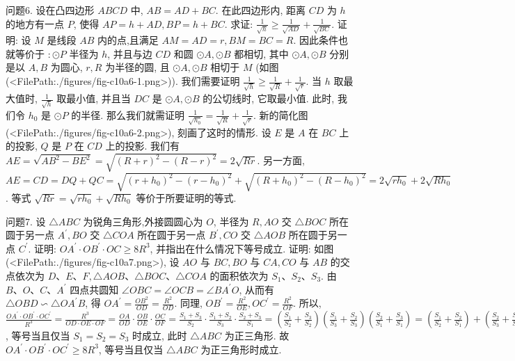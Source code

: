 问题6. 设在凸四边形 $A B C D$ 中, $A B=A D+B C$. 在此四边形内, 距离 $C D$ 为 $h$ 的地方有一点 $P$, 使得 $A P=h+A D, B P=h+B C$. 求证: $\frac{1}{\sqrt{h}} \geqslant \frac{1}{\sqrt{A D}}+\frac{1}{\sqrt{B C}}$.
证明: 设 $M$ 是线段 $A B$ 内的点,且满足 $A M= A D=r, B M=B C=R$. 因此条件也就等价于 $: \odot P$ 半径为 $h$, 并且与边 $C D$ 和圆 $\odot A, \odot B$ 都相切, 其中 $\odot A, \odot B$ 分别是以 $A, B$ 为圆心, $r, R$ 为半径的圆, 且 $\odot A, \odot B$ 相切于 $M$ (如图(<FilePath:./figures/fig-c10a6-1.png>)).
我们需要证明 $\frac{1}{\sqrt{h}} \geqslant \frac{1}{\sqrt{R}}+\frac{1}{\sqrt{r}}$. 当 $h$ 取最大值时, $\frac{1}{\sqrt{h}}$ 取最小值, 并且当 $D C$ 是 $\odot A, \odot B$ 的公切线时, 它取最小值.
此时, 我们令 $h_0$ 是 $\odot P$ 的半径.
那么我们就需证明 $\frac{1}{\sqrt{h_0}}=\frac{1}{\sqrt{R}}+\frac{1}{\sqrt{r}}$.
新的简化图(<FilePath:./figures/fig-c10a6-2.png>), 刻画了这时的情形.
设 $E$ 是 $A$ 在 $B C$ 上的投影, $Q$ 是 $P$ 在 $C D$ 上的投影.
我们有 $A E= \sqrt{A B^2-B E^2}=\sqrt{(R+r)^2-(R-r)^2}=2 \sqrt{R r}$.
另一方面, $A E=C D=D Q+Q C=\sqrt{\left(r+h_0\right)^2-\left(r-h_0\right)^2}+ \sqrt{\left(R+h_0\right)^2-\left(R-h_0\right)^2}=2 \sqrt{r h_0}+2 \sqrt{R h_0}$. 等式 $\sqrt{R r}=\sqrt{r h_0}+\sqrt{R h_0}$ 等价于所要证明的等式.



问题7. 设 $\triangle A B C$ 为锐角三角形,外接圆圆心为 $O$, 半径为 $R, A O$ 交 $\triangle B O C$ 所在圆于另一点 $A^{\prime}, B O$ 交 $\triangle C O A$ 所在圆于另一点 $B^{\prime}, C O$ 交 $\triangle A O B$ 所在圆于另一点 $C^{\prime}$. 证明: $O A^{\prime} \cdot O B^{\prime} \cdot O C \geqslant 8 R^3$, 并指出在什么情况下等号成立.
证明: 如图(<FilePath:./figures/fig-c10a7.png>), 设 $A O$ 与 $B C, B O$ 与 $C A, C O$ 与 $A B$ 的交点依次为 $D 、 E 、 F, \triangle A O B 、 \triangle B O C 、 \triangle C O A$ 的面积依次为 $S_1 、 S_2 、 S_3$. 由 $B 、 O 、 C 、 A^{\prime}$ 四点共圆知 $\angle O B C=\angle O C B=\angle B A^{\prime} O$, 从而有 $\triangle O B D \backsim \triangle O A^{\prime} B$, 得 $O A^{\prime}=\frac{O B^2}{O D}=\frac{R^2}{O D}$. 同理, $O B^{\prime}=\frac{R^2}{O E}, O C^{\prime}=\frac{R^2}{O F}$. 所以, $\frac{O A^{\prime} \cdot O B^{\prime} \cdot O C^{\prime}}{R^3}=\frac{R^3}{O D \cdot O E \cdot O F}=\frac{O A}{O D} \cdot \frac{O B}{O E} \cdot \frac{O C}{O F}=\frac{S_1+S_3}{S_2} \cdot \frac{S_1+S_2}{S_3} \cdot \frac{S_2+S_3}{S_1}=\left(\frac{S_1}{S_2}+\frac{S_3}{S_2}\right)\left(\frac{S_1}{S_3}+\frac{S_2}{S_3}\right)\left(\frac{S_2}{S_1}+\frac{S_3}{S_1}\right)=\left(\frac{S_1}{S_2}+\frac{S_2}{S_1}\right)+ \left(\frac{S_2}{S_3}+\frac{S_3}{S_2}\right)+\left(\frac{S_3}{S_1}+\frac{S_1}{S_3}\right)+2 \geqslant 8$, 等号当且仅当 $S_1=S_2=S_3$ 时成立, 此时 $\triangle A B C$ 为正三角形.
故 $O A^{\prime} \cdot O B^{\prime} \cdot O C^{\prime} \geqslant 8 R^3$, 等号当且仅当 $\triangle A B C$ 为正三角形时成立.



